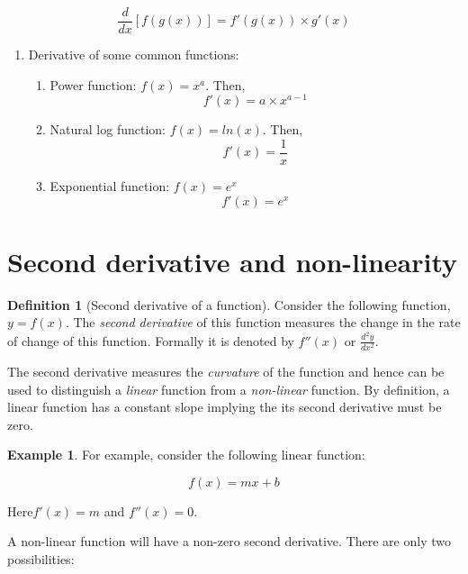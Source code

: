 \documentclass[
]{book}
\theoremstyle{definition}
\newtheorem{definition}{Definition}[chapter]
\theoremstyle{definition}
\newtheorem{example}{Example}[chapter]
\theoremstyle{definition}
\theoremstyle{definition}
\theoremstyle{remark}
\begin{document}
\[ \frac{d}{dx} [f(g(x))] = f'(g(x)) \times g'(x)\]

\begin{enumerate}
\def\labelenumi{\arabic{enumi}.}
\setcounter{enumi}{7}
\item
  Derivative of some common functions:

  \begin{enumerate}
  \def\labelenumii{\alph{enumii}.}
  \item
    Power function: \(f(x)=x^a\). Then,
    \[f'(x)=a \times x^{a-1}\]
  \item
    Natural log function: \(f(x)=ln(x)\). Then,
    \[f'(x) = \frac{1}{x}\]
  \item
    Exponential function: \(f(x)=e^x\)
    \[f'(x)=e^x\]
  \end{enumerate}
\end{enumerate}

\hypertarget{second-derivative-and-non-linearity}{%
\section{Second derivative and non-linearity}\label{second-derivative-and-non-linearity}}

\begin{definition}[Second derivative of a function]
\protect\hypertarget{def:unnamed-chunk-3}{}\label{def:unnamed-chunk-3}Consider the following function, \(y=f(x)\). The \emph{second derivative} of this function measures the change in the rate of change of this function. Formally it is denoted by \(f''(x)\) or \(\displaystyle{\frac{d^2y}{dx^2}}\).
\end{definition}

The second derivative measures the \emph{curvature} of the function and hence can be used to distinguish a \emph{linear} function from a \emph{non-linear} function. By definition, a linear function has a constant slope implying the its second derivative must be zero.

\begin{example}
\protect\hypertarget{exm:unnamed-chunk-4}{}\label{exm:unnamed-chunk-4}For example, consider the following linear function:

\[f(x) = mx +b\]

Here\(f'(x)=m\) and \(f''(x)=0\).
\end{example}

A non-linear function will have a non-zero second derivative. There are only two possibilities:
\end{document}
